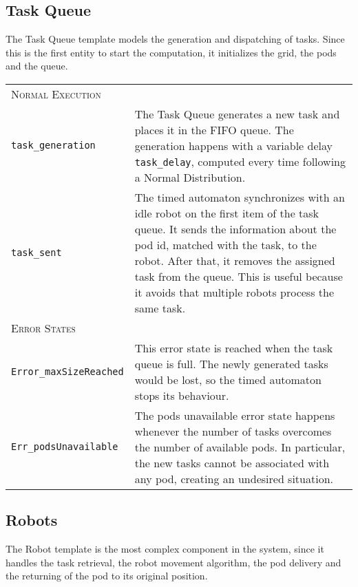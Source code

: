 \subsection{Task Queue}
The Task Queue template models the generation and dispatching of tasks. Since this is the first entity to start the computation, it initializes the grid, the pods and the queue. 

\begin{tabularx}{\textwidth}{lX}
\multicolumn{2}{l}{{\scshape Normal Execution}}
 \vspace{0,2cm}\\
\texttt{task\_generation} & The Task Queue generates a new task and places it in the FIFO queue. The generation happens with a variable delay \texttt{task\_delay}, computed every time following a Normal Distribution. \vspace{0,2cm}\\
\texttt{task\_sent} & The timed automaton synchronizes with an idle robot on the first item of the task queue. It sends the information about the pod id, matched with the task, to the robot. After that, it removes the assigned task from the queue. This is useful because it avoids that multiple robots process the same task. \vspace{0,4cm}\\
\multicolumn{2}{l}{{\scshape Error States}} \vspace{0,2cm}\\
\texttt{Error\_maxSizeReached}  & This error state is reached when the task queue is full. The newly generated tasks would be lost, so the timed automaton stops its behaviour. \vspace{0,2cm}\\
\texttt{Err\_podsUnavailable}   & The pods unavailable error state happens whenever the number of tasks overcomes the number of available pods. In particular, the new tasks cannot be associated with any pod, creating an undesired situation.  \vspace{0,2cm}\\
\end{tabularx}

\subsection{Robots}
The Robot template is the most complex component in the system, since it handles the task retrieval, the robot movement algorithm, the pod delivery and the returning of the pod to its original position.


